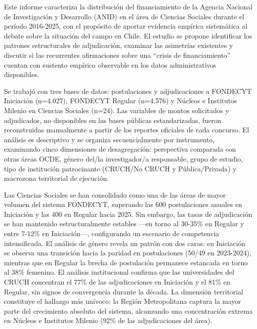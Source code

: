 \documentclass[
  spanish,
  a4paper,
  oneside]{scrbook}
\begin{document}
Este informe caracteriza la distribución del financiamiento de la
Agencia Nacional de Investigación y Desarrollo (ANID) en el área de
Ciencias Sociales durante el período 2016-2025, con el propósito de
aportar evidencia empírica sistemática al debate sobre la situación del
campo en Chile. El estudio se propone identificar los patrones
estructurales de adjudicación, examinar las asimetrías existentes y
discutir si las recurrentes afirmaciones sobre una ``crisis de
financiamiento'' cuentan con sustento empírico observable en los datos
administrativos disponibles.

Se trabajó con tres bases de datos: postulaciones y adjudicaciones a
FONDECYT Iniciación (n=4.027), FONDECYT Regular (n=4.576) y Núcleos e
Institutos Milenio en Ciencias Sociales (n=24). Las variables de montos
solicitados y adjudicados, no disponibles en las bases públicas
estandarizadas, fueron reconstruidas manualmente a partir de los
reportes oficiales de cada concurso. El análisis es descriptivo y se
organiza secuencialmente por instrumento, examinando cinco dimensiones
de desagregación: perspectiva comparada con otras áreas OCDE, género
del/la investigador/a responsable, grupo de estudio, tipo de institución
patrocinante (CRUCH/No CRUCH y Pública/Privada) y macrozona territorial
de ejecución.

Las Ciencias Sociales se han consolidado como una de las áreas de mayor
volumen del sistema FONDECYT, superando las 600 postulaciones anuales en
Iniciación y las 400 en Regular hacia 2025. Sin embargo, las tasas de
adjudicación se han mantenido estructuralmente estables ---en torno al
30-35\% en Regular y entre 7-12\% en Iniciación---, configurando un
escenario de competencia intensificada. El análisis de género revela un
patrón con dos caras: en Iniciación se observa una transición hacia la
paridad en postulaciones (50/49 en 2023-2024), mientras que en Regular
la brecha de postulación permanece estancada en torno al 38\% femenino.
El análisis institucional confirma que las universidades del CRUCH
concentran el 77\% de las adjudicaciones en Iniciación y el 81\% en
Regular, sin signos de convergencia durante la década. La dimensión
territorial constituye el hallazgo más unívoco: la Región Metropolitana
captura la mayor parte del crecimiento absoluto del sistema, alcanzando
una concentración extrema en Núcleos e Institutos Milenio (92\% de las
adjudicaciones del área).
\end{document}
